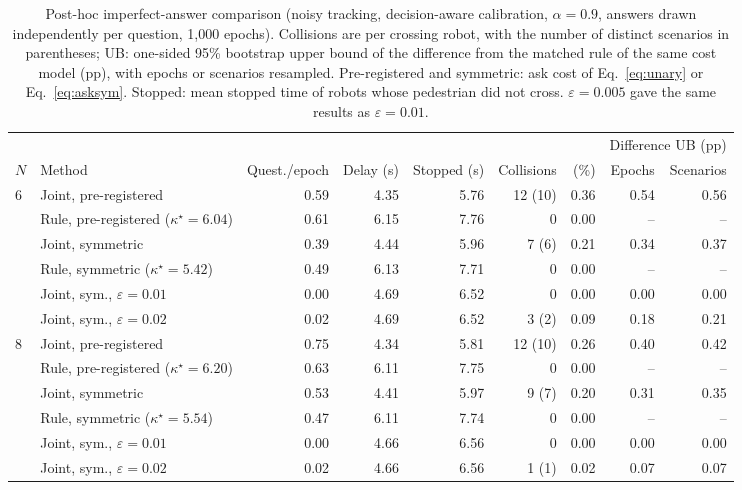 \documentclass[a4paper,fleqn]{cas-dc}
\begin{document}
\begin{table}
\centering
\caption{Post-hoc imperfect-answer comparison (noisy tracking, decision-aware calibration, $\alpha = 0.9$, answers drawn independently per question, 1{,}000 epochs). Collisions are per crossing robot, with the number of distinct scenarios in parentheses; UB: one-sided 95\% bootstrap upper bound of the difference from the matched rule of the same cost model (pp), with epochs or scenarios resampled. Pre-registered and symmetric: ask cost of Eq.~\eqref{eq:unary} or Eq.~\eqref{eq:asksym}. Stopped: mean stopped time of robots whose pedestrian did not cross. $\varepsilon = 0.005$ gave the same results as $\varepsilon = 0.01$.}
\label{tab:posthoc}
\begin{tabular*}{\textwidth}{@{\extracolsep{\fill}}llrrrrrrr}
\toprule
 & & & & & & & \multicolumn{2}{c}{Difference UB (pp)} \\
\cmidrule(lr){8-9}
$N$ & Method & Quest./epoch & Delay (s) & Stopped (s) & Collisions & (\%) & Epochs & Scenarios \\
\midrule
6 & Joint, pre-registered & 0.59 & 4.35 & 5.76 & 12 (10) & 0.36 & 0.54 & 0.56 \\
  & Rule, pre-registered ($\kappa^\star = 6.04$) & 0.61 & 6.15 & 7.76 & 0 & 0.00 & -- & -- \\
  & Joint, symmetric & 0.39 & 4.44 & 5.96 & 7 (6) & 0.21 & 0.34 & 0.37 \\
  & Rule, symmetric ($\kappa^\star = 5.42$) & 0.49 & 6.13 & 7.71 & 0 & 0.00 & -- & -- \\
  & Joint, sym., $\varepsilon = 0.01$ & 0.00 & 4.69 & 6.52 & 0 & 0.00 & 0.00 & 0.00 \\
  & Joint, sym., $\varepsilon = 0.02$ & 0.02 & 4.69 & 6.52 & 3 (2) & 0.09 & 0.18 & 0.21 \\
\midrule
8 & Joint, pre-registered & 0.75 & 4.34 & 5.81 & 12 (10) & 0.26 & 0.40 & 0.42 \\
  & Rule, pre-registered ($\kappa^\star = 6.20$) & 0.63 & 6.11 & 7.75 & 0 & 0.00 & -- & -- \\
  & Joint, symmetric & 0.53 & 4.41 & 5.97 & 9 (7) & 0.20 & 0.31 & 0.35 \\
  & Rule, symmetric ($\kappa^\star = 5.54$) & 0.47 & 6.11 & 7.74 & 0 & 0.00 & -- & -- \\
  & Joint, sym., $\varepsilon = 0.01$ & 0.00 & 4.66 & 6.56 & 0 & 0.00 & 0.00 & 0.00 \\
  & Joint, sym., $\varepsilon = 0.02$ & 0.02 & 4.66 & 6.56 & 1 (1) & 0.02 & 0.07 & 0.07 \\
\bottomrule
\end{tabular*}
\end{table}
\end{document}
